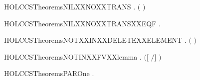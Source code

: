 \newcommand{\HOLCCSTheoremsLENGTHXXDELETEXXELEMENTXXLEQ}{\UseVerbatim{HOLCCSTheoremsLENGTHXXDELETEXXELEMENTXXLEQ}}
\begin{SaveVerbatim}{HOLCCSTheoremsNILXXNOXXTRANS}
\HOLTokenTurnstile{} \HOLSymConst{\HOLTokenForall{}} . \HOLSymConst{\HOLTokenNeg{}}\ensuremath{(} \HOLTokenTransBegin{}\HOLTokenTransEnd {}\ensuremath{)}
\end{SaveVerbatim}
\newcommand{\HOLCCSTheoremsNILXXNOXXTRANS}{\UseVerbatim{HOLCCSTheoremsNILXXNOXXTRANS}}
\begin{SaveVerbatim}{HOLCCSTheoremsNILXXNOXXTRANSXXEQF}
\HOLTokenTurnstile{} \HOLSymConst{\HOLTokenForall{}} .  \HOLTokenTransBegin{}\HOLTokenTransEnd {} \HOLSymConst{\HOLTokenEquiv{}} 
\end{SaveVerbatim}
\newcommand{\HOLCCSTheoremsNILXXNOXXTRANSXXEQF}{\UseVerbatim{HOLCCSTheoremsNILXXNOXXTRANSXXEQF}}
\begin{SaveVerbatim}{HOLCCSTheoremsNOTXXINXXDELETEXXELEMENT}
\HOLTokenTurnstile{} \HOLSymConst{\HOLTokenForall{}} . \HOLSymConst{\HOLTokenNeg{}}  \ensuremath{(}  \ensuremath{)}
\end{SaveVerbatim}
\newcommand{\HOLCCSTheoremsNOTXXINXXDELETEXXELEMENT}{\UseVerbatim{HOLCCSTheoremsNOTXXINXXDELETEXXELEMENT}}
\begin{SaveVerbatim}{HOLCCSTheoremsNOTINXXFVXXlemma}
\HOLTokenTurnstile{} \HOLSymConst{\HOLTokenForall{}}  .  \HOLConst{\HOLTokenNotIn{}}  \ensuremath{(}\ensuremath{[}  \ensuremath{/}\ensuremath{]} \ensuremath{)}
\end{SaveVerbatim}
\newcommand{\HOLCCSTheoremsNOTINXXFVXXlemma}{\UseVerbatim{HOLCCSTheoremsNOTINXXFVXXlemma}}
\begin{SaveVerbatim}{HOLCCSTheoremsPAROne}
\HOLTokenTurnstile{} \HOLSymConst{\HOLTokenForall{}}   .  \HOLTokenTransBegin{}\HOLTokenTransEnd {} \HOLSymConst{\HOLTokenImp{}}  \HOLSymConst{\ensuremath{\mid}}  \HOLTokenTransBegin{}\HOLTokenTransEnd {} \HOLSymConst{\ensuremath{\mid}} 
\end{SaveVerbatim}
